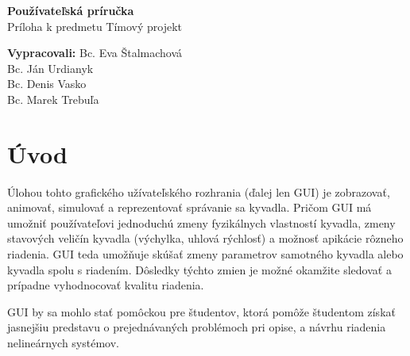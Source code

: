 
\usepackage{parskip}%
\usepackage[dvipsnames]{xcolor}

\begin{titlepage}


\begin{center}
	\vspace*{5.5cm}
	 \textbf{\Huge Používateľská príručka}\\
	 \vspace*{1cm}
	 Príloha k predmetu Tímový projekt	 
	
\end{center}
	\vspace*{9.5cm}
	\textbf{Vypracovali:} \hspace*{0.5cm} Bc. Eva Štalmachová\\
	 \hspace*{3.2cm} Bc. Ján Urdianyk\\ 
	 \hspace*{3.2cm} Bc. Denis Vasko\\
	 \hspace*{3.2cm} Bc. Marek Trebuľa
\end{titlepage}

\tableofcontents{}
\newpage


\section{Úvod}
Úlohou tohto grafického užívateľského rozhrania (ďalej len GUI) je zobrazovať, animovať, simulovať a reprezentovať správanie sa kyvadla. Pričom GUI má umožniť používateľovi jednoduchú zmeny fyzikálnych vlastností kyvadla, zmeny stavových veličín kyvadla (výchylka, uhlová rýchlosť) a možnosť apikácie rôzneho riadenia. GUI teda umožňuje skúšať zmeny parametrov samotného kyvadla alebo kyvadla spolu s riadením. Dôsledky týchto zmien je možné okamžite sledovať a prípadne vyhodnocovať kvalitu riadenia. 

GUI by sa mohlo stať pomôckou pre študentov, ktorá pomôže študentom získať jasnejšiu predstavu o prejednávaných problémoch pri opise, a návrhu riadenia nelineárnych systémov.

\newpage
